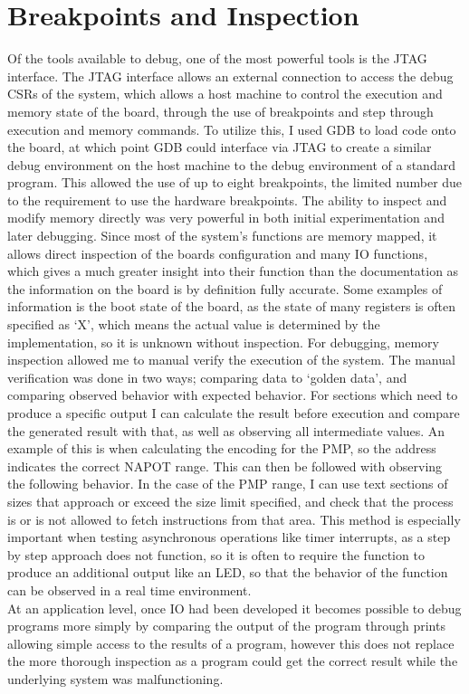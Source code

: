 \section{Breakpoints and Inspection}
Of the tools available to debug, one of the most powerful tools is the JTAG interface. The JTAG interface allows an external connection to access the debug CSRs of the system, which allows a host machine to control the execution and memory state of the board, through the use of breakpoints and step through execution and memory commands. To utilize this, I used GDB to load code onto the board, at which point GDB could interface via JTAG to create a similar debug environment on the host machine to the debug environment of a standard program. This allowed the use of up to eight breakpoints, the limited number due to the requirement to use the hardware breakpoints. The ability to inspect and modify memory directly was very powerful in both initial experimentation and later debugging. Since most of the system's functions are memory mapped, it allows direct inspection of the boards configuration and many IO functions, which gives a much greater insight into their function than the documentation as the information on the board is by definition fully accurate. Some examples of information is the boot state of the board, as the state of many registers is often specified as `X', which means the actual value is determined by the implementation, so it is unknown without inspection. For debugging, memory inspection allowed me to manual verify the execution of the system. The manual verification was done in two ways; comparing data to `golden data', and comparing observed behavior with expected behavior. For sections which need to produce a specific output I can calculate the result before execution and compare the generated result with that, as well as observing all intermediate values. An example of this is when calculating the encoding for the PMP, so the address indicates the correct NAPOT range. This can then be followed with observing the following behavior. In the case of the PMP range, I can use text sections of sizes that approach or exceed the size limit specified, and check that the process is or is not allowed to fetch instructions from that area. This method is especially important when testing asynchronous operations like timer interrupts, as a step by step approach does not function, so it is often to require the function to produce an additional output like an LED, so that the behavior of the function can be observed in a real time environment.\\
At an application level, once IO had been developed it becomes possible to debug programs more simply by comparing the output of the program through prints allowing simple access to the results of a program, however this does not replace the more thorough inspection as a program could get the correct result while the underlying system was malfunctioning.

